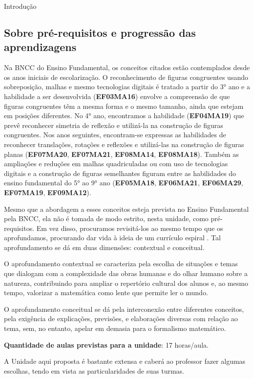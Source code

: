 \begin{apresentacao}{Introdução}
\subsection{Sobre pré-requisitos e progressão das aprendizagens}
Na BNCC do Ensino Fundamental, os conceitos citados estão contemplados desde os anos iniciais de escolarização. O reconhecimento de figuras congruentes usando sobreposição, malhas e mesmo tecnologias digitais é tratado a partir do 3° ano e a habilidade a ser desenvolvida (\textbf{EF03MA16}) envolve a compreensão de que figuras congruentes têm a mesma forma e o mesmo tamanho, ainda que estejam em posições diferentes. No 4° ano, encontramos a habilidade (\textbf{EF04MA19}) que prevê reconhecer simetria de reflexão e utilizá-la na construção de figuras congruentes. Nos anos seguintes, encontram-se expressas as habilidades de reconhecer translações, rotações e reflexões e utilizá-las na construção de figuras planas (\textbf{EF07MA20}, \textbf{EF07MA21}, \textbf{EF08MA14}, \textbf{EF08MA18}). Também as ampliações e reduções em malhas quadriculadas ou com uso de tecnologias digitais e a construção de figuras semelhantes figuram entre as habilidades do ensino fundamental do 5° ao 9° ano (\textbf{EF05MA18}, \textbf{EF06MA21}, \textbf{EF06MA29}, \textbf{EF07MA19}, \textbf{EF09MA12}). 

Mesmo que a abordagem a esses conceitos esteja prevista no Ensino Fundamental pela BNCC, ela não é tomada de modo estrito, nesta unidade, como pré-requisitos. Em vez disso, procuramos revisitá-los ao mesmo tempo que os aprofundamos, procurando dar vida à ideia de um currículo espiral \citep{bruner1960,roldao1994}. Tal aprofundamento se dá em duas dimensões: contextual e conceitual. 

O aprofundamento contextual se caracteriza pela escolha de situações e temas que dialogam com a complexidade das obras humanas e do olhar humano sobre a natureza, contribuindo para ampliar o repertório cultural dos alunos e, ao mesmo tempo, valorizar a matemática como lente que permite ler o mundo. 

O aprofundamento conceitual se dá pela interconexão entre diferentes conceitos, pela exigência de explicações, previsões, e elaborações diversas com relação ao tema, sem, no entanto, apelar em demasia para o formalismo matemático. 

\textbf{Quantidade de aulas previstas para a unidade}: 17 horas/aula.

A Unidade aqui proposta é bastante extensa e caberá ao professor fazer algumas escolhas, tendo em vista as particularidades de suas turmas. 
	

\end{apresentacao}
